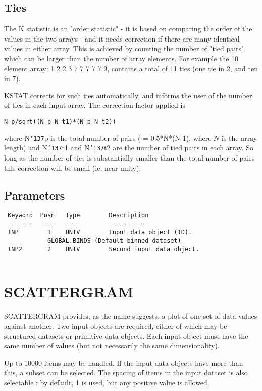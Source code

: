 \documentclass{book}
\renewcommand{\_}{{\tt\char'137}}     %
\begin{document}
\subsection{Ties}
The K statistic is an "order statistic" - it is based on comparing
the order of the values in the two arrays - and it needs correction
if there are many identical values in either array. This is achieved
by counting the number of "tied pairs", which can be larger than the
number of array elements. For example the 10 element array: 1 2 2 3
7 7 7 7 7 9, contains a total of 11 ties (one tie in 2, and ten in 7).
 
KSTAT corrects for such ties automatically, and informs the user of
the number of ties in each input array. The correction factor applied
is
\begin{verbatim}
N_p/sqrt((N_p-N_t1)*(N_p-N_t2))
\end{verbatim}
where N\_p is the total number of pairs ( = 0.5*N*(N-1), where
$N$ is the array length) and N\_t1 and N\_t2
are the number of tied pairs in each array. So long as the number of ties
is substantially smaller than the total number of pairs this correction
will be small (ie. near unity).
 
\subsection{Parameters}
\begin{verbatim}
 Keyword  Posn   Type        Description
 -------  ----   ----        -----------
 INP        1    UNIV        Input data object (1D).
            GLOBAL.BINDS (Default binned dataset)
 INP2       2    UNIV        Second input data object.
 
\end{verbatim}\section{SCATTERGRAM}
SCATTERGRAM provides, as the name suggests, a plot of one
set of data values against another. Two input objects are
required, either of which may be structured datasets or
primitive data objects. Each input object must have the
same number of values (but not necessarily the same
dimensionality).
 
Up to 10000 items may be handled. If the input data objects
have more than this, a subset can be selected. The spacing
of items in the input dataset is also selectable : by
default, 1 is used, but any positive value is allowed.
 
\end{document}
